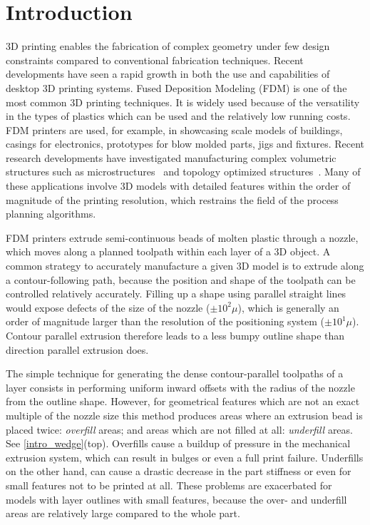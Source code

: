 \section{Introduction}
3D printing enables the fabrication of complex geometry under few design constraints compared to conventional fabrication techniques.
Recent developments have seen a rapid growth in both the use and capabilities of desktop 3D printing systems.
Fused Deposition Modeling (FDM) is one of the most common 3D printing techniques.
It is widely used because of the versatility in the types of plastics which can be used and the relatively low running costs.
FDM printers are used, for example, in showcasing scale models of buildings, casings for electronics, prototypes for blow molded parts, jigs and fixtures.
Recent research developments have investigated manufacturing complex volumetric structures such as microstructures~\cite{bates2018compressive,Al-Ketan2018,Maskery2018} and topology optimized structures~\cite{Zegard2016SMO,Wu2019a,Cheng2019}.
Many of these applications involve 3D models with detailed features within the order of magnitude of the printing resolution, which restrains the field of the process planning algorithms.

FDM printers extrude semi-continuous beads of molten plastic through a nozzle, which moves along a planned toolpath within each layer of a 3D object.
A common strategy to accurately manufacture a given 3D model is to extrude along a contour-following path,
because the position and shape of the toolpath can be controlled relatively accurately.
Filling up a shape using parallel straight lines would expose defects of the size of the nozzle ($\pm 10^2 \mu$), which is generally an order of magnitude larger than the resolution of the positioning system ($\pm 10^1 \mu$).
Contour parallel extrusion therefore leads to a less bumpy outline shape than direction parallel extrusion does.


The simple technique for generating the dense contour-parallel toolpaths of a layer consists in performing uniform inward offsets with the radius of the nozzle from the outline shape.
However, for geometrical features which are not an exact multiple of the nozzle size this method produces areas where an extrusion bead is placed twice: \emph{overfill} areas; and areas which are not filled at all: \emph{underfill} areas.
See \cref{intro_wedge}(top).
Overfills cause a buildup of pressure in the mechanical extrusion system, which can result in bulges or even a full print failure.
Underfills on the other hand, can cause a drastic decrease in the part stiffness or even for small features not to be printed at all.
These problems are exacerbated for models with layer outlines with small features, because the over- and underfill areas are relatively large compared to the whole part.

